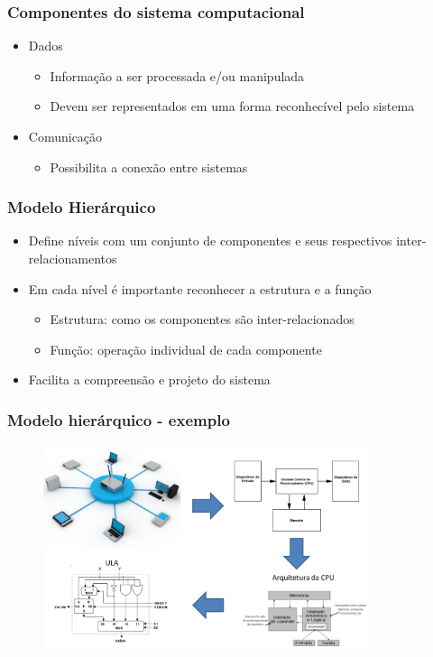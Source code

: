 \documentclass[aspectratio=169,
				xcolor=table]{beamer}
\begin{document}
	\begin{frame}
		\frametitle{Componentes do sistema computacional}
		\begin{itemize}
			\item Dados
			\begin{itemize}
				\item Informação a ser processada e/ou manipulada
				\item Devem ser representados em uma forma reconhecível pelo sistema
			\end{itemize}
			\vspace{1em}
			\item Comunicação
			\begin{itemize}
				\item Possibilita a conexão entre sistemas
			\end{itemize}
		\end{itemize}
	\end{frame}
	
	\begin{frame}
		\frametitle{Modelo Hierárquico}
		\begin{itemize}
			\item Define níveis com um conjunto de componentes e seus respectivos inter-relacionamentos
			\vspace{1em}
			\item Em cada nível é importante reconhecer a estrutura e a função
			\begin{itemize}
				\item Estrutura: como os componentes são inter-relacionados
				\item Função: operação individual de cada componente
			\end{itemize}
			\vspace{1em}			
			\item Facilita a compreensão e projeto do sistema

		\end{itemize}
	\end{frame}

	\begin{frame}
		\frametitle{Modelo hierárquico - exemplo}
		\begin{figure}
			\centering
			\includegraphics[height=6cm, keepaspectratio]{../figs/cap01/hierarquia.png} 
		\end{figure}
	\end{frame}
\end{document}
